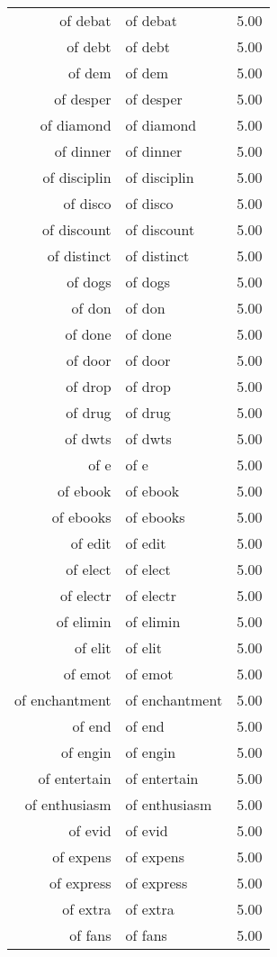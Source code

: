 \begin{table}[ht]
\begin{tabular}{rlr}
  of debat & of debat & 5.00 \\ 
  of debt & of debt & 5.00 \\ 
  of dem & of dem & 5.00 \\ 
  of desper & of desper & 5.00 \\ 
  of diamond & of diamond & 5.00 \\ 
  of dinner & of dinner & 5.00 \\ 
  of disciplin & of disciplin & 5.00 \\ 
  of disco & of disco & 5.00 \\ 
  of discount & of discount & 5.00 \\ 
  of distinct & of distinct & 5.00 \\ 
  of dogs & of dogs & 5.00 \\ 
  of don & of don & 5.00 \\ 
  of done & of done & 5.00 \\ 
  of door & of door & 5.00 \\ 
  of drop & of drop & 5.00 \\ 
  of drug & of drug & 5.00 \\ 
  of dwts & of dwts & 5.00 \\ 
  of e & of e & 5.00 \\ 
  of ebook & of ebook & 5.00 \\ 
  of ebooks & of ebooks & 5.00 \\ 
  of edit & of edit & 5.00 \\ 
  of elect & of elect & 5.00 \\ 
  of electr & of electr & 5.00 \\ 
  of elimin & of elimin & 5.00 \\ 
  of elit & of elit & 5.00 \\ 
  of emot & of emot & 5.00 \\ 
  of enchantment & of enchantment & 5.00 \\ 
  of end & of end & 5.00 \\ 
  of engin & of engin & 5.00 \\ 
  of entertain & of entertain & 5.00 \\ 
  of enthusiasm & of enthusiasm & 5.00 \\ 
  of evid & of evid & 5.00 \\ 
  of expens & of expens & 5.00 \\ 
  of express & of express & 5.00 \\ 
  of extra & of extra & 5.00 \\ 
  of fans & of fans & 5.00 \\ 

\end{tabular}
\end{table}
